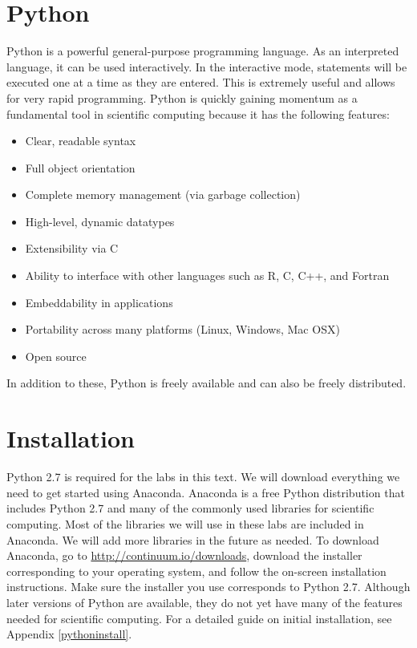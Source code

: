 \label{lab:Essential_Python}


\section*{Python}
Python is a powerful general-purpose programming language. As an interpreted
language, it can be used interactively.
In the interactive mode, statements will be executed one at a time as they are entered.
This is extremely useful and allows for very rapid programming.
Python is quickly gaining momentum as a fundamental tool in scientific computing because it has the following features:
\begin{itemize}
\item Clear, readable syntax
\item Full object orientation
\item Complete memory management (via garbage collection)
\item High-level, dynamic datatypes
\item Extensibility via C
\item Ability to interface with other languages such as R, C, C++, and Fortran
\item Embeddability in applications
\item Portability across many platforms (Linux, Windows, Mac OSX)
\item Open source
\end{itemize}
In addition to these, Python is freely available and can also be freely distributed.

\section*{Installation}
Python 2.7 is required for the labs in this text. We will download everything we need to get started using Anaconda. 
Anaconda is a free Python distribution that includes Python 2.7 and many of the commonly used libraries for scientific computing. 
Most of the libraries we will use in these labs are included in Anaconda. We will add more libraries in the future as needed. 
To download Anaconda, go to \url{http://continuum.io/downloads}, download the installer corresponding to your operating system, and follow the on-screen installation instructions. 
Make sure the installer you use corresponds to Python 2.7. Although later versions of Python are available, they do not yet have many of the features needed for scientific computing. 
For a detailed guide on initial installation, see Appendix \ref{pythoninstall}. 


